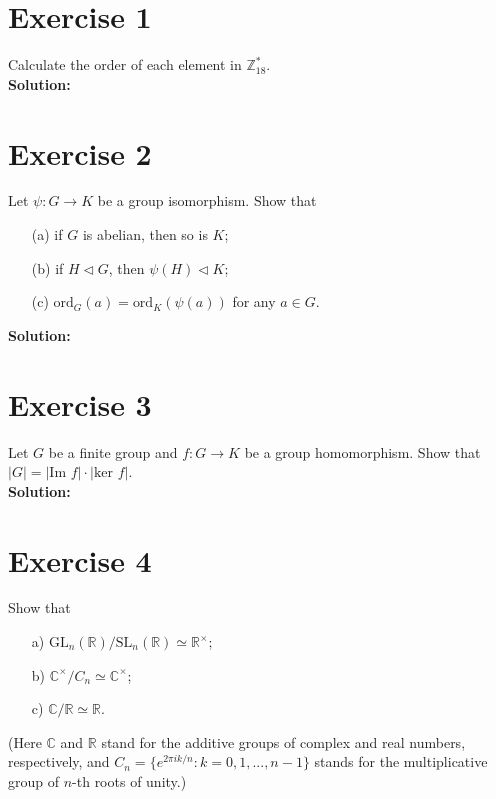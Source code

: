 \documentclass{article}
\begin{document}
\section*{Exercise 1}
Calculate the order of each element in $\mathbb{Z}_{18}^*$. \\

\textbf{Solution:} \\



\newpage

\section*{Exercise 2}
Let $\psi: G \to K$ be a group isomorphism. Show that
\begin{itemize}
\item[(a)] if $G$ is abelian, then so is $K$;
\item[(b)] if $H \triangleleft G$, then $\psi(H) \triangleleft K$;
\item[(c)] $\text{ord}_G(a) = \text{ord}_K(\psi(a))$ for any $a \in G$.
\end{itemize}

\textbf{Solution:} \\



\newpage

\section*{Exercise 3}
Let $G$ be a finite group and $f: G \to K$ be a group homomorphism. Show that $|G| = |\text{Im } f| \cdot |\text{ker } f|$. \\

\textbf{Solution:} \\



\newpage

\section*{Exercise 4}
Show that
\begin{itemize}
\item[a)] $\text{GL}_n(\mathbb{R})/\text{SL}_n(\mathbb{R}) \simeq \mathbb{R}^\times$;
\item[b)] $\mathbb{C}^\times/C_n \simeq \mathbb{C}^\times$;
\item[c)] $\mathbb{C}/\mathbb{R} \simeq \mathbb{R}$.
\end{itemize}
(Here $\mathbb{C}$ and $\mathbb{R}$ stand for the additive groups of complex and real numbers, respectively, and $C_n = \{e^{2\pi i k/n}: k = 0,1,...,n-1\}$ stands for the multiplicative group of $n$-th roots of unity.) \\
\end{document}
